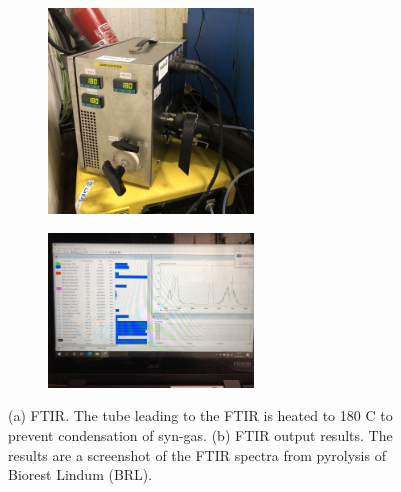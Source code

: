\begin{figure}
    \centering
    \begin{subfigure}[t]{\textwidth}
         \centering
         \includegraphics[width=0.6\textwidth]{Bilder/Pyrolysis/FTIR.jpg}
         \caption{}
         \label{appFig:FTIRbox}
     \end{subfigure}
     \hfill
     \begin{subfigure}[t]{\textwidth}
         \centering
         \includegraphics[width=0.6\textwidth]{Bilder/Pyrolysis/FTIRresults.png}
         \caption{}
         \label{appFig:FTIRresults}
     \end{subfigure}
     \hfill
     \caption{(a) FTIR. The tube leading to the FTIR is heated to 180 \textdegree C to prevent condensation of syn-gas. (b) FTIR output results. The results are a screenshot of the FTIR spectra from pyrolysis of Biorest Lindum (BRL).}
    \label{appFig:FTIR}
\end{figure}


